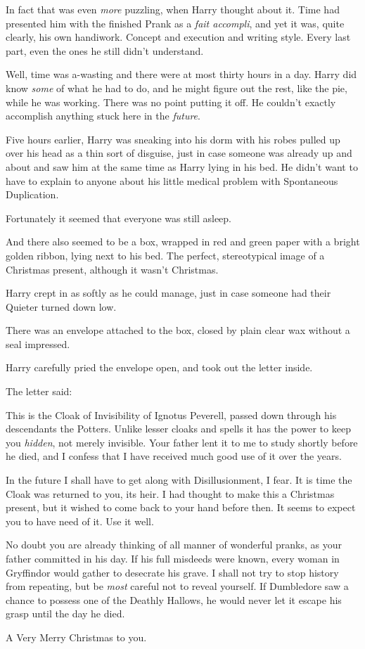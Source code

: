 In fact that was even \emph{more} puzzling, when Harry thought about it. Time had presented him with the finished Prank as a \emph{fait accompli}, and yet it was, quite clearly, his own handiwork. Concept and execution and writing style. Every last part, even the ones he still didn't understand.

Well, time was a-wasting and there were at most thirty hours in a day. Harry did know \emph{some} of what he had to do, and he might figure out the rest, like the pie, while he was working. There was no point putting it off. He couldn't exactly accomplish anything stuck here in the \emph{future}.

\later

Five hours earlier, Harry was sneaking into his dorm with his robes pulled up over his head as a thin sort of disguise, just in case someone was already up and about and saw him at the same time as Harry lying in his bed. He didn't want to have to explain to anyone about his little medical problem with Spontaneous Duplication.

Fortunately it seemed that everyone was still asleep.

And there also seemed to be a box, wrapped in red and green paper with a bright golden ribbon, lying next to his bed. The perfect, stereotypical image of a Christmas present, although it wasn't Christmas.

Harry crept in as softly as he could manage, just in case someone had their Quieter turned down low.

There was an envelope attached to the box, closed by plain clear wax without a seal impressed.

Harry carefully pried the envelope open, and took out the letter inside.

The letter said:

\begin{writtenNote}
This is the Cloak of Invisibility of Ignotus Peverell, passed down through his descendants the Potters. Unlike lesser cloaks and spells it has the power to keep you \emph{hidden}, not merely invisible. Your father lent it to me to study shortly before he died, and I confess that I have received much good use of it over the years.

In the future I shall have to get along with Disillusionment, I fear. It is time the Cloak was returned to you, its heir. I had thought to make this a Christmas present, but it wished to come back to your hand before then. It seems to expect you to have need of it. Use it well.

No doubt you are already thinking of all manner of wonderful pranks, as your father committed in his day. If his full misdeeds were known, every woman in Gryffindor would gather to desecrate his grave. I shall not try to stop history from repeating, but be \emph{most} careful not to reveal yourself. If Dumbledore saw a chance to possess one of the Deathly Hallows, he would never let it escape his grasp until the day he died.

A Very Merry Christmas to you.
\end{writtenNote}

